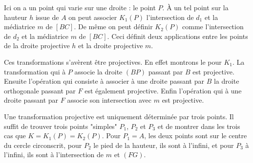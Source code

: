 \begin{sol}
\begin{center}
\end{center}

Ici on a un point qui varie sur une droite : le point $P$. À un tel point sur la hauteur $h$ issue de $A$ on peut associer $K_1(P)$ l'intersection de $d_1$ et la médiatrice $m$ de $[BC]$. De même on peut définir $K_2(P)$ comme l'intersection de $d_2$ et la médiatrice $m$ de $[BC]$. Ceci définit deux applications entre les points de la droite projective $h$ et la droite projective $m$.

\medskip

Ces transformations s'avèrent être projectives. En effet montrons le pour $K_1$. La transformation qui à $P$ associe la droite $(BP)$ passant par $B$ est projective. Ensuite l'opération qui consiste à associer à une droite passant par $B$ la droite orthogonale passant par $F$ est également projective. Enfin l'opération qui à une droite passant par $F$ associe son intersection avec $m$ est projective.

\medskip

Une transformation projective est uniquement déterminée par trois points. Il suffit de trouver trois points "simples" $P_1$, $P_2$ et $P_3$ et de montrer dans les trois cas que $K=K_1(P)=K_2(P)$. Pour $P_1=A$, les deux points sont sur le centre du cercle circonscrit, pour $P_2$ le pied de la hauteur, ils sont à l'infini, et pour $P_3$ à l'infini, ils sont à l'intersection de $m$ et $(FG)$.
\end{sol}



